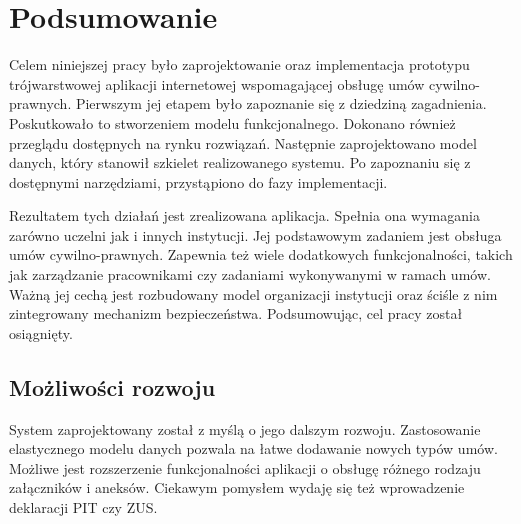 \chapter{Podsumowanie}
Celem niniejszej pracy było zaprojektowanie oraz implementacja prototypu trójwarstwowej aplikacji internetowej wspomagającej obsługę umów cywilno-prawnych. Pierwszym jej etapem było zapoznanie się z dziedziną zagadnienia. Poskutkowało to stworzeniem modelu funkcjonalnego. Dokonano również przeglądu dostępnych na rynku rozwiązań. Następnie zaprojektowano model danych, który stanowił szkielet realizowanego systemu. Po zapoznaniu się z dostępnymi narzędziami, przystąpiono do fazy implementacji. 

Rezultatem tych działań jest zrealizowana aplikacja. Spełnia ona wymagania zarówno uczelni jak i innych instytucji. Jej podstawowym zadaniem jest obsługa umów cywilno-prawnych. Zapewnia też wiele dodatkowych funkcjonalności, takich jak zarządzanie pracownikami czy zadaniami wykonywanymi w ramach umów. Ważną jej cechą jest rozbudowany model organizacji instytucji oraz ściśle z nim zintegrowany mechanizm bezpieczeństwa. Podsumowując, cel pracy został osiągnięty.

\section[Możliwości rozwoju][Możliwości rozwoju]{Możliwości rozwoju}
System zaprojektowany został z myślą o jego dalszym rozwoju. Zastosowanie elastycznego modelu danych pozwala na łatwe dodawanie nowych typów umów. Możliwe jest rozszerzenie funkcjonalności aplikacji o obsługę różnego rodzaju załączników i aneksów. Ciekawym pomysłem wydaję się też wprowadzenie deklaracji PIT czy ZUS. 



